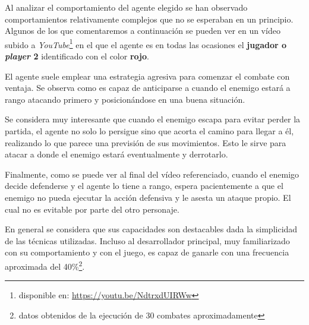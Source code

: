 Al analizar el comportamiento del agente elegido se han observado comportamientos relativamente complejos que no se esperaban en un principio. Algunos de los que comentaremos a continuación se pueden ver en un vídeo subido a \textit{YouTube}\footnote{disponible en: \url{https://youtu.be/NdtrxdUIRWw}} en el que el agente es en todas las ocasiones el \textbf{jugador o \textit{player} 2} identificado con el color \textbf{rojo}.

\bigskip

El agente suele emplear una estrategia agresiva para comenzar el combate con ventaja. Se observa como es capaz de anticiparse a cuando el enemigo estará a rango atacando primero y posicionándose en una buena situación.

\bigskip

Se considera muy interesante que cuando el enemigo escapa para evitar perder la partida, el agente no solo lo persigue sino que acorta el camino para llegar a él, realizando lo que parece una previsión de sus movimientos. Esto le sirve para atacar a donde el enemigo estará eventualmente y derrotarlo.

\bigskip

Finalmente, como se puede ver al final del vídeo referenciado, cuando el enemigo decide defenderse y el agente lo tiene a rango, espera pacientemente a que el enemigo no pueda ejecutar la acción defensiva y le asesta un ataque propio. El cual no es evitable por parte del otro personaje.

\bigskip

En general se considera que sus capacidades son destacables dada la simplicidad de las técnicas utilizadas. Incluso al desarrollador principal, muy familiarizado con su comportamiento y con el juego, es capaz de ganarle con una frecuencia aproximada del 40\%\footnote{datos obtenidos de la ejecución de 30 combates aproximadamente}.


